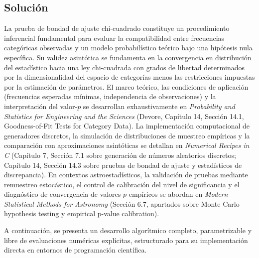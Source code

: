 \documentclass[12pt]{article}
\begin{document}
\subsection{Solución}
La prueba de bondad de ajuste chi-cuadrado constituye un procedimiento inferencial fundamental para evaluar la compatibilidad entre frecuencias categóricas observadas y un modelo probabilístico teórico bajo una hipótesis nula específica. Su validez asintótica se fundamenta en la convergencia en distribución del estadístico hacia una ley chi-cuadrada con grados de libertad determinados por la dimensionalidad del espacio de categorías menos las restricciones impuestas por la estimación de parámetros. El marco teórico, las condiciones de aplicación (frecuencias esperadas mínimas, independencia de observaciones) y la interpretación del valor-$p$ se desarrollan exhaustivamente en \textit{Probability and Statistics for Engineering and the Sciences} (Devore, Capítulo 14, Sección 14.1, Goodness-of-Fit Tests for Category Data). La implementación computacional de generadores discretos, la simulación de distribuciones de muestreo empíricas y la comparación con aproximaciones asintóticas se detallan en \textit{Numerical Recipes in C} (Capítulo 7, Sección 7.1 sobre generación de números aleatorios discretos; Capítulo 14, Sección 14.3 sobre pruebas de bondad de ajuste y estadísticos de discrepancia). En contextos astroestadísticos, la validación de pruebas mediante remuestreo estocástico, el control de calibración del nivel de significancia y el diagnóstico de convergencia de valores-$p$ empíricos se abordan en \textit{Modern Statistical Methods for Astronomy} (Sección 6.7, apartados sobre Monte Carlo hypothesis testing y empirical p-value calibration).

A continuación, se presenta un desarrollo algorítmico completo, parametrizable y libre de evaluaciones numéricas explícitas, estructurado para su implementación directa en entornos de programación científica.
\end{document}
